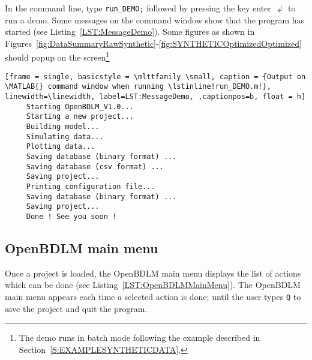 In the \MATLAB{} command line, type  
\colorbox{light-gray}{\lstinline[basicstyle = \mlttfamily \small, backgroundcolor = \color{light-gray}]!run_DEMO;! }
 followed by pressing the key enter $\dlsh$ to run a demo. 
Some messages on the \MATLAB{} command window show that the program has started (see Listing~\ref{LST:MessageDemo}).
Some figures as shown in Figures~\ref{fig:DataSummaryRawSynthetic}-\ref{fig:SYNTHETICOptimizedOptimized} should popup on the screen\footnote{The demo runs in batch mode following the example described in Section~\ref{S:EXAMPLESYNTHETICDATA}.}


\begin{lstlisting}[frame = single, basicstyle = \mlttfamily \small, caption = {Output on \MATLAB{} command window when running \lstinline!run_DEMO.m!}, linewidth=\linewidth, label=LST:MessageDemo, ,captionpos=b, float = h] 
     Starting OpenBDLM_V1.0...
     Starting a new project...
     Building model...
     Simulating data...
     Plotting data...
     Saving database (binary format) ...
     Saving database (csv format) ...
     Saving project...
     Printing configuration file...
     Saving database (binary format) ...
     Saving project...
     Done ! See you soon !
\end{lstlisting}



\subsection{OpenBDLM main menu}
\label{S:OPENBDLMMAINMENU}

Once a project is loaded, the OpenBDLM main menu displays the list of actions which can be done (see Listing~\ref{LST:OpenBDLMMainMenu}). 
The OpenBDLM main menu appears each time a selected action is done; until the user types \colorbox{light-gray}{\lstinline[basicstyle = \mlttfamily \small ]!Q!} to save the project and quit the program.

